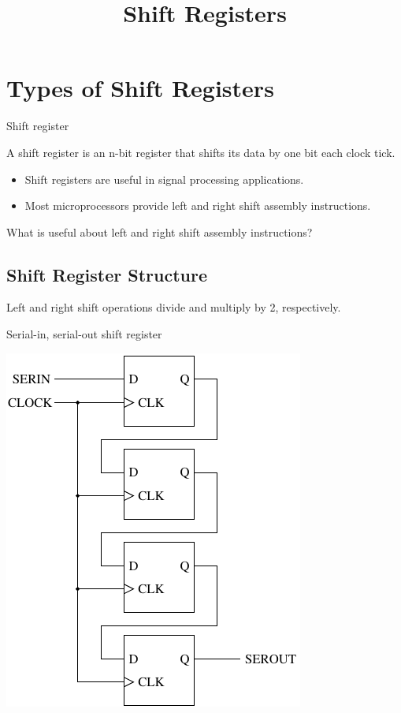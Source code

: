 \title{Shift Registers}

\section{Types of Shift Registers}

\begin{frame}{Shift register}
  \begin{definition}
    A \alert{shift register} is an n-bit register that shifts its data by one bit each clock tick.
  \end{definition}
  \begin{itemize}
    \item Shift registers are useful in signal processing applications.
    \item Most microprocessors provide left and right shift assembly instructions.
  \end{itemize}
  What is useful about left and right shift assembly instructions?
\end{frame}

\subsection{Shift Register Structure}

Left and right shift operations divide and multiply by 2, respectively.

\begin{frame}{Serial-in, serial-out shift register}
  \begin{center}
    \includegraphics[scale=0.9]{SerialInSerialOutShiftRegister}
  \end{center}
\end{frame}

